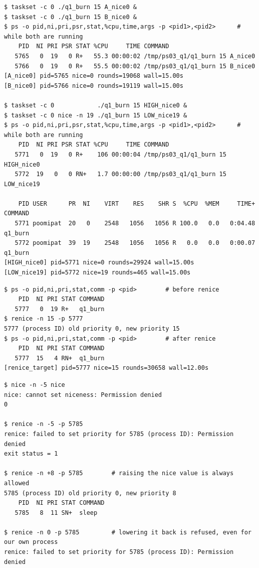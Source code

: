 \documentclass[a4paper,11pt]{article}
\newcommand{\code}[1]{\texttt{#1}}
\begin{document}
\begin{lstlisting}[style=terminal,caption={กรณีควบคุม (nice 0 กับ 0) เทียบกับกรณีทดลอง (nice 0 กับ 19) ผูกไว้ที่ CPU 0 ทั้งคู่}]
$ taskset -c 0 ./q1_burn 15 A_nice0 &
$ taskset -c 0 ./q1_burn 15 B_nice0 &
$ ps -o pid,ni,pri,psr,stat,%cpu,time,args -p <pid1>,<pid2>      # while both are running
    PID  NI PRI PSR STAT %CPU     TIME COMMAND
   5765   0  19   0 R+   55.3 00:00:02 /tmp/ps03_q1/q1_burn 15 A_nice0
   5766   0  19   0 R+   55.5 00:00:02 /tmp/ps03_q1/q1_burn 15 B_nice0
[A_nice0] pid=5765 nice=0 rounds=19068 wall=15.00s
[B_nice0] pid=5766 nice=0 rounds=19119 wall=15.00s

$ taskset -c 0            ./q1_burn 15 HIGH_nice0 &
$ taskset -c 0 nice -n 19 ./q1_burn 15 LOW_nice19 &
$ ps -o pid,ni,pri,psr,stat,%cpu,time,args -p <pid1>,<pid2>      # while both are running
    PID  NI PRI PSR STAT %CPU     TIME COMMAND
   5771   0  19   0 R+    106 00:00:04 /tmp/ps03_q1/q1_burn 15 HIGH_nice0
   5772  19   0   0 RN+   1.7 00:00:00 /tmp/ps03_q1/q1_burn 15 LOW_nice19

    PID USER      PR  NI    VIRT    RES    SHR S  %CPU  %MEM     TIME+ COMMAND
   5771 poomipat  20   0    2548   1056   1056 R 100.0   0.0   0:04.48 q1_burn
   5772 poomipat  39  19    2548   1056   1056 R   0.0   0.0   0:00.07 q1_burn
[HIGH_nice0] pid=5771 nice=0 rounds=29924 wall=15.00s
[LOW_nice19] pid=5772 nice=19 rounds=465 wall=15.00s
\end{lstlisting}

\begin{lstlisting}[style=terminal,caption={\code{renice} เปลี่ยนค่าของ process ที่กำลังรันอยู่}]
$ ps -o pid,ni,pri,stat,comm -p <pid>        # before renice
    PID  NI PRI STAT COMMAND
   5777   0  19 R+   q1_burn
$ renice -n 15 -p 5777
5777 (process ID) old priority 0, new priority 15
$ ps -o pid,ni,pri,stat,comm -p <pid>        # after renice
    PID  NI PRI STAT COMMAND
   5777  15   4 RN+  q1_burn
[renice_target] pid=5777 nice=15 rounds=30658 wall=12.00s
\end{lstlisting}

\begin{lstlisting}[style=terminal,caption={ผู้ใช้ทั่วไปเพิ่มค่า nice ได้ แต่ลดไม่ได้}]
$ nice -n -5 nice
nice: cannot set niceness: Permission denied
0

$ renice -n -5 -p 5785
renice: failed to set priority for 5785 (process ID): Permission denied
exit status = 1

$ renice -n +8 -p 5785        # raising the nice value is always allowed
5785 (process ID) old priority 0, new priority 8
    PID  NI PRI STAT COMMAND
   5785   8  11 SN+  sleep

$ renice -n 0 -p 5785         # lowering it back is refused, even for our own process
renice: failed to set priority for 5785 (process ID): Permission denied
\end{lstlisting}
\end{document}
